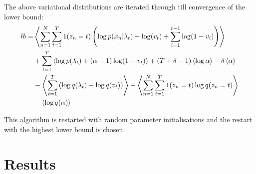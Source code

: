 \documentclass{article}
\begin{document}
The above variational distributions are iterated through till convergence of the lower bound:
\begin{align}
\nonumber lb=&\left\langle\sum_{n=1}^{N}\sum_{t=1}^{T} 1(z_n=t)\left(\log p(x_n|\lambda_t)-\log(v_t)+\sum_{i=1}^{t-1}\log(1-v_i)\right)\right\rangle\\
\nonumber &+\sum_{t=1}^{T} \left\langle\log p(\lambda_t)+(\alpha-1)\log(1-v_t)\right\rangle+(T+\delta-1)\left\langle\log\alpha\right\rangle-\delta\left\langle\alpha\right\rangle\\
\nonumber &-\left\langle\sum_{t=1}^{T}\left(\log q(\lambda_t)-\log q(v_t)\right)\right\rangle-\left\langle\sum_{n=1}^{N}\sum_{t=1}^{T} 1(z_n=t)\log q(z_n=t)\right\rangle\\
&-\left\langle\log q(\alpha)\right\rangle
\end{align}

This algorithm is restarted with random parameter initialisations and the restart with the highest lower bound is chosen.

\section{Results}
\end{document}

